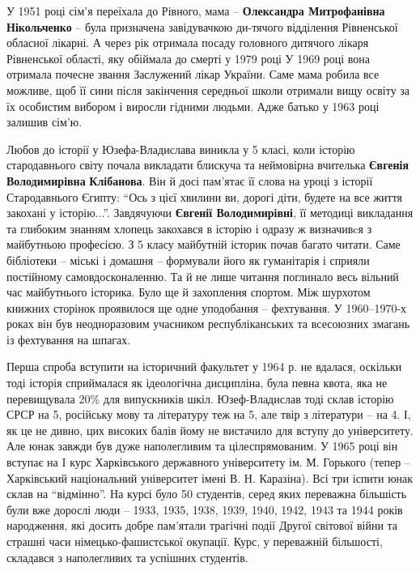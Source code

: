 
У 1951 році сім'я переїхала до Рівного, мама – \textbf{Олександра Митрофанівна
Нікольченко} – була призначена завідувачкою ди\hyp{}тячого відділення Рівненської
обласної лікарні. А через рік отримала посаду головного дитячого лікаря
Рівненської області, яку обіймала до смерті у 1979 році У 1969 році вона
отримала почесне звання Заслужений лікар України. Саме мама робила все можливе,
щоб її сини після закінчення середньої школи отримали вищу освіту за їх
особистим вибором і виросли гідними людьми. Адже батько у 1963 році залишив
сім'ю.

Любов до історії у Юзефа-Владислава виникла у 5 класі, коли історію
стародавнього світу почала викладати блискуча та неймовірна вчителька \textbf{Євгенія
Володимирівна} \textbf{Клібанова}. Він й досі пам'ятає її слова на уроці з історії
Стародавнього Єгипту: \enquote{Ось з цієї хвилини ви, дорогі діти, будете на все життя
закохані у історію...}. Завдячуючи \textbf{Євгенії Володимирівні}, її методиці викладання
та глибоким знанням хлопець закохався в історію і одразу ж визначивcя з
майбутньою професією. З 5 класу майбутній історик почав багато читати. Саме
бібліотеки – міські і домашня – формували його як гуманітарія і сприяли
постійному самовдосконаленню. Та й не лише читання поглинало весь вільний час
майбутнього історика. Було ще й захоплення спортом. Між шурхотом книжних
сторінок проявилося ще одне уподобання – фехтування. У 1960–1970-х роках він
був неодноразовим учасником республіканських та всесоюзних змагань із
фехтування на шпагах.


Перша спроба вступити на історичний факультет у 1964 р. не вдалася, оскільки
тоді історія сприймалася як ідеологічна дисципліна, була певна квота, яка не
перевищувала 20\% для випускників шкіл. Юзеф-Владислав тоді склав історію СРСР
на 5, російську мову та літературу теж на 5, але твір з літератури – на 4. І,
як це не дивно, цих високих балів йому не вистачило для вступу до університету.
Але юнак завжди був дуже наполегливим та цілеспрямованим. У 1965 році він
вступає на I курс Харківського державного університету ім. М. Горького (тепер –
Харківський національний університет імені В. Н. Каразіна). Всі три іспити юнак
склав на \enquote{відмінно}. На курсі було 50 студентів, серед яких переважна більшість
були вже дорослі люди – 1933, 1935, 1938, 1939, 1940, 1942, 1943 та 1944 років
народження, які досить добре пам'ятали трагічні події Другої світової війни та
страшні часи німецько-фашистської окупації. Курс, у переважній більшості,
складався з наполегливих та успішних студентів.

